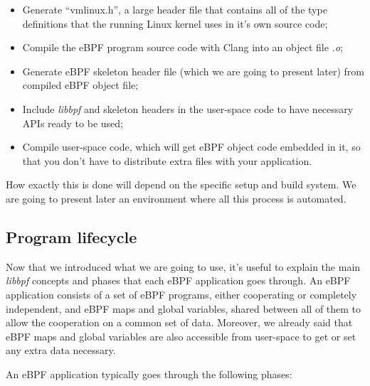 \begin{itemize}
	\item Generate ``vmlinux.h'', a large header file that contains all of the type
		definitions that the running Linux kernel uses in it’s own source code; 
	\item Compile the eBPF program source code with Clang into an object file
		\textit{.o};
	\item Generate eBPF skeleton header file (which we are going to present later)
		from compiled eBPF object file;
	\item Include \textit{libbpf} and skeleton headers in the user-space code to have
		necessary APIs ready to be used;
	\item Compile user-space code, which will get eBPF object code embedded in it, so
		that you don’t have to distribute extra files with your application.
\end{itemize}

How exactly this is done will depend on the specific setup and build system.
We are going to present later an environment where all this process is automated.

\subsection{Program lifecycle}

Now that we introduced what we are going to use, it’s useful to explain the main \textit{libbpf} concepts and phases that each eBPF application goes through. 
An eBPF application consists of a set of eBPF programs, either cooperating or completely independent, and eBPF maps and global variables, shared between all of them to allow the cooperation on a common set of data. 
Moreover, we already said that eBPF maps and global variables are also accessible from user-space to get or set any extra data necessary. 

An eBPF application typically goes through the following phases:

